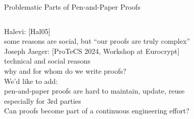 \begin{frame}{Problematic Parts of Pen-and-Paper Proofs}
\begin{columns}[fullwidth,c]
\begin{column}{.68\linewidth}
      Halevi: [Hal05]\\
      \hspace{1.618em} some reasons are social, but “our proofs are truly complex”\\[1.5em]

      Joseph Jaeger: [ProTeCS 2024, Workshop at Eurocrypt]\\
      \hspace{1.618em} technical and social reasons\\
      \hspace{1.618em} why and for whom do we write proofs?\\[1.5em]%

      We'd like to add:\\
      \hspace{1.618em} pen-and-paper proofs are hard to maintain, update, reuse\\
      \hspace{1.618em} especially for 3rd parties\\[1.5em]%

      Can proofs become part of a continuous engineering effort?%
    \end{column}
  \end{columns}
\end{frame}
